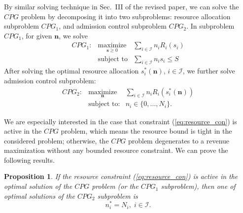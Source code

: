 \documentclass[twocolumn,10pt,twosided]{IEEEtran}
\newtheorem{proposition}{Proposition}
\begin{document}
By similar solving technique in Sec.~III of the revised paper,
we can solve the $CPG$ problem by decomposing it into two subproblems: resource allocation subproblem $CPG_1$, and admission control subproblem $CPG_2$.
In subproblem $CPG_1$, for given $\boldsymbol{n}$, we solve
\begin{eqnarray*}
    CPG_1:& \underset{\boldsymbol{s}\geq 0}{\text{maximize}} & \sum\limits_{i\in\mathcal{I}} n_i R_i(s_i) \nonumber \\
    &\text{subject to}& \sum\limits_{i\in\mathcal{I}} n_i s_{i} \le S
\end{eqnarray*}
After solving the optimal resource allocation
$s^*_i(\boldsymbol{n})$, $i\in\mathcal{I}$, we further solve admission control
subproblem:
\begin{eqnarray*}
    CPG_2:& \underset{\boldsymbol{n}}{\text{maximize}} & \sum\limits_{i\in\mathcal{I}} n_i R_i(s^*_i(\boldsymbol{n})) \\
&\text{subject to}:& n_i \in\{0,\ldots,N_{i}\}.
\end{eqnarray*}


We are especially interested in the case that constraint (\ref{eq:resource_con}) is active in the $CPG$ problem, which means the resource bound is tight in the considered problem; otherwise, the $CPG$ problem degenerates to a revenue maximization without any bounded resource constraint. We can prove the following results.
\begin{proposition}
\label{pro:general_utility_1} If the resource constraint
(\ref{eq:resource_con}) is active in the optimal solution of
the $CPG$ problem (or the $CPG_1$ subproblem), then  one of optimal
solutions of the $CPG_2$ subproblem is
\begin{equation}
    n_i^*=N_i,\;i\in \mathcal{I}.
\end{equation}
\end{proposition}
\end{document}

